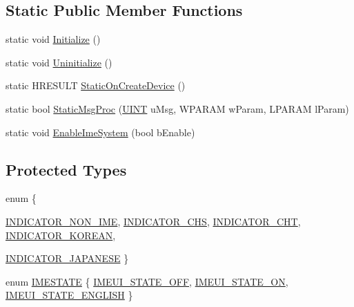 \subsection*{Static Public Member Functions}
\begin{DoxyCompactItemize}
\item 
static void \hyperlink{class_c_d_x_u_t_i_m_e_edit_box_abf7a8ceb1f658ddbde5493c319edcac1}{Initialize} ()
\item 
static void \hyperlink{class_c_d_x_u_t_i_m_e_edit_box_a4841b38797ea767a64898d95fee899cf}{Uninitialize} ()
\item 
static HRESULT \hyperlink{class_c_d_x_u_t_i_m_e_edit_box_a6bd5ac93dd74ac14a1e6422d9d549aad}{StaticOnCreateDevice} ()
\item 
static bool \hyperlink{class_c_d_x_u_t_i_m_e_edit_box_ae6c5d46eaaf42af035d3b4dbaa420243}{StaticMsgProc} (\hyperlink{class_c_d_x_u_t_i_m_e_edit_box_a7c83b549328a07897bdac88bb0ac4d68}{UINT} uMsg, WPARAM wParam, LPARAM lParam)
\item 
static void \hyperlink{class_c_d_x_u_t_i_m_e_edit_box_ae8f7bd48b81e44c434a14107f8d36076}{EnableImeSystem} (bool bEnable)
\end{DoxyCompactItemize}
\subsection*{Protected Types}
\begin{DoxyCompactItemize}
\item 
enum \{ \par
\hyperlink{class_c_d_x_u_t_i_m_e_edit_box_a3ed4d9f2016d546ab06a859728c079d9a42cffb2bda6f0fbd7445dfeac185da4f}{INDICATOR\_\-NON\_\-IME}, 
\hyperlink{class_c_d_x_u_t_i_m_e_edit_box_a3ed4d9f2016d546ab06a859728c079d9a1094c443a66339e8f49b1776806b1c45}{INDICATOR\_\-CHS}, 
\hyperlink{class_c_d_x_u_t_i_m_e_edit_box_a3ed4d9f2016d546ab06a859728c079d9a4be1cf30b37172f37a966965b8e9b270}{INDICATOR\_\-CHT}, 
\hyperlink{class_c_d_x_u_t_i_m_e_edit_box_a3ed4d9f2016d546ab06a859728c079d9a11f9c15497b6759e5f19ece18ea3dc5b}{INDICATOR\_\-KOREAN}, 
\par
\hyperlink{class_c_d_x_u_t_i_m_e_edit_box_a3ed4d9f2016d546ab06a859728c079d9a20dedc79016b7d61bebf024c3acbfebe}{INDICATOR\_\-JAPANESE}
 \}
\item 
enum \hyperlink{class_c_d_x_u_t_i_m_e_edit_box_ab368d30c2733c242574b8388065d09f2}{IMESTATE} \{ \hyperlink{class_c_d_x_u_t_i_m_e_edit_box_ab368d30c2733c242574b8388065d09f2a4ff8ca238fe3e11934a6aa7cf9494e1d}{IMEUI\_\-STATE\_\-OFF}, 
\hyperlink{class_c_d_x_u_t_i_m_e_edit_box_ab368d30c2733c242574b8388065d09f2aea3de31c8cae605a2de27846bfda4b73}{IMEUI\_\-STATE\_\-ON}, 
\hyperlink{class_c_d_x_u_t_i_m_e_edit_box_ab368d30c2733c242574b8388065d09f2afafd2c0d84569198cc136f9bde5dad1a}{IMEUI\_\-STATE\_\-ENGLISH}
 \}
\end{DoxyCompactItemize}
